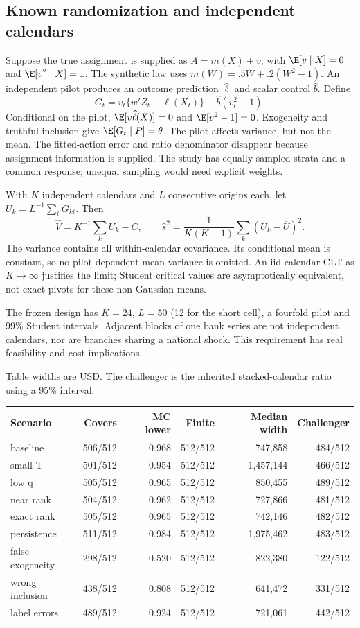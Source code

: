 \subsection{Known randomization and independent calendars}
Suppose the true assignment is supplied as $A=m(X)+v$, with $\E[v\mid X]=0$ and $\E[v^2\mid X]=1$. The synthetic law uses $m(W)=.5W+.2(W^2-1)$. An independent pilot produces an outcome prediction $\widehat\ell$ and scalar control $\widehat b$. Define
\[
 G_t=v_t\{w'Z_t-\widehat\ell(X_t)\}-\widehat b(v_t^2-1).
\]
Conditional on the pilot, $\E[v\widehat\ell(X)]=0$ and $\E[v^2-1]=0$. Exogeneity and truthful inclusion give $\E[G_t\mid P]=\theta$. The pilot affects variance, but not the mean. The fitted-action error and ratio denominator disappear because assignment information is supplied. The study has equally sampled strata and a common response; unequal sampling would need explicit weights.

With $K$ independent calendars and $L$ consecutive origins each, let $U_k=L^{-1}\sum_tG_{kt}$. Then
\[
 \widehat V=K^{-1}\sum_k U_k-C,\qquad
 \widehat s^2=\frac1{K(K-1)}\sum_k(U_k-\overline U)^2.
\]
The variance contains all within-calendar covariance. Its conditional mean is constant, so no pilot-dependent mean variance is omitted. An iid-calendar CLT as $K\to\infty$ justifies the limit; Student critical values are asymptotically equivalent, not exact pivots for these non-Gaussian means.

The frozen design has $K=24$, $L=50$ (12 for the short cell), a fourfold pilot and 99\% Student intervals. Adjacent blocks of one bank series are not independent calendars, nor are branches sharing a national shock. This requirement has real feasibility and cost implications.

Table widths are USD. The challenger is the inherited stacked-calendar ratio using a 95\% interval.

\begin{center}\footnotesize\begin{tabular}{lrrrrr}\toprule
Scenario & Covers & MC lower & Finite & Median width & Challenger\\
\midrule
baseline & 506/512 & 0.968 & 512/512 & 747,858 & 484/512 \\
small T & 501/512 & 0.954 & 512/512 & 1,457,144 & 466/512 \\
low q & 505/512 & 0.965 & 512/512 & 850,455 & 489/512 \\
near rank & 504/512 & 0.962 & 512/512 & 727,866 & 481/512 \\
exact rank & 505/512 & 0.965 & 512/512 & 742,146 & 482/512 \\
persistence & 511/512 & 0.984 & 512/512 & 1,975,462 & 483/512 \\
false exogeneity & 298/512 & 0.520 & 512/512 & 822,380 & 122/512 \\
wrong inclusion & 438/512 & 0.808 & 512/512 & 641,472 & 331/512 \\
label errors & 489/512 & 0.924 & 512/512 & 721,061 & 442/512 \\
\bottomrule\end{tabular}\end{center}


